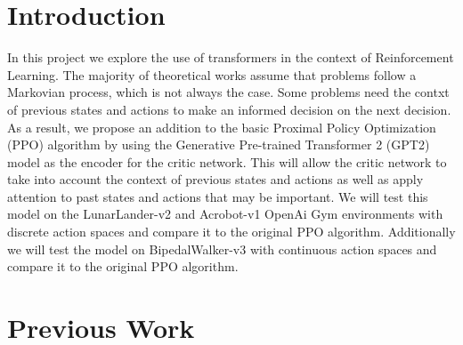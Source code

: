\section{Introduction}
In this project we explore the use of transformers in the context of Reinforcement Learning. The majority of theoretical works 
assume that problems follow a Markovian process, which is not always the case. Some problems need the contxt of previous states and actions
to make an informed decision on the next decision. As a result, we propose an addition to the basic Proximal Policy Optimization (PPO) algorithm
by using the Generative Pre-trained Transformer 2 (GPT2) model as the encoder for the critic network. This will allow the critic network to
take into account the context of previous states and actions as well as apply attention to past states and actions that may be important. 
We will test this model on the LunarLander-v2 and Acrobot-v1 OpenAi Gym environments with discrete action spaces and compare it to the original PPO algorithm. 
Additionally we will test the model on BipedalWalker-v3 with continuous action spaces and compare it to the original PPO algorithm.



\section{Previous Work}


